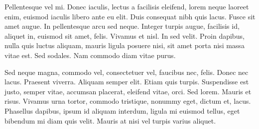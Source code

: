 \documentclass{book}
\begin{document}
Pellentesque vel mi. Donec iaculis, lectus a facilisis eleifend, lorem neque laoreet enim, euismod iaculis libero ante eu elit. Duis consequat nibh quis lacus. Fusce sit amet augue. In pellentesque arcu sed neque. Integer turpis augue, facilisis id, aliquet in, euismod sit amet, felis. Vivamus et nisl. In sed velit. Proin dapibus, nulla quis luctus aliquam, mauris ligula posuere nisi, sit amet porta nisi massa vitae est. Sed sodales. Nam commodo diam vitae purus.

Sed neque magna, commodo vel, consectetuer vel, faucibus nec, felis. Donec nec lacus. Praesent viverra. Aliquam semper elit. Etiam quis turpis. Suspendisse est justo, semper vitae, accumsan placerat, eleifend vitae, orci. Sed lorem. Mauris et risus. Vivamus urna tortor, commodo tristique, nonummy eget, dictum et, lacus. Phasellus dapibus, ipsum id aliquam interdum, ligula mi euismod tellus, eget bibendum mi diam quis velit. Mauris at nisi vel turpis varius aliquet.

\printindex
\printindex[zum]
\end{document}
